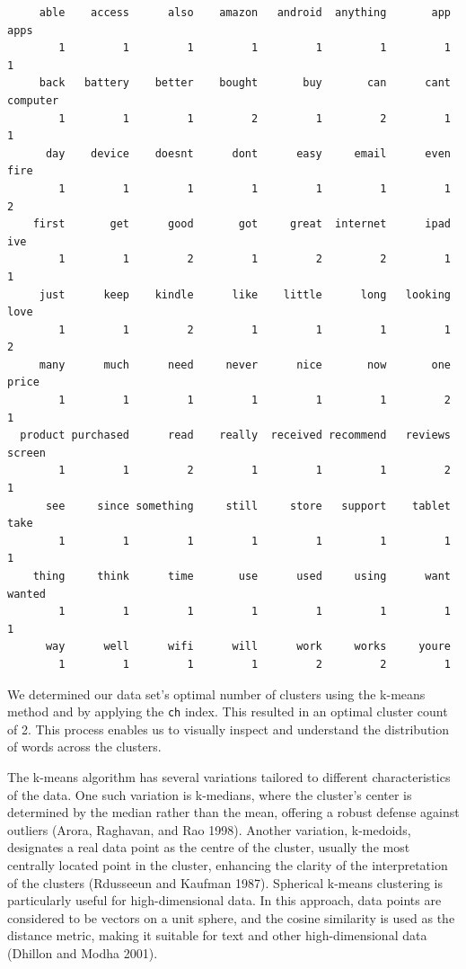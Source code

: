 \begin{verbatim}
     able    access      also    amazon   android  anything       app      apps 
        1         1         1         1         1         1         1         1 
     back   battery    better    bought       buy       can      cant  computer 
        1         1         1         2         1         2         1         1 
      day    device    doesnt      dont      easy     email      even      fire 
        1         1         1         1         1         1         1         2 
    first       get      good       got     great  internet      ipad       ive 
        1         1         2         1         2         2         1         1 
     just      keep    kindle      like    little      long   looking      love 
        1         1         2         1         1         1         1         2 
     many      much      need     never      nice       now       one     price 
        1         1         1         1         1         1         2         1 
  product purchased      read    really  received recommend   reviews    screen 
        1         1         2         1         1         1         2         1 
      see     since something     still     store   support    tablet      take 
        1         1         1         1         1         1         1         1 
    thing     think      time       use      used     using      want    wanted 
        1         1         1         1         1         1         1         1 
      way      well      wifi      will      work     works     youre 
        1         1         1         1         2         2         1 
\end{verbatim}

We determined our data set's optimal number of clusters using the k-means
method and by applying the \texttt{ch} index. This resulted in an
optimal cluster count of 2. This process enables us to visually inspect
and understand the distribution of words across the clusters.

The k-means algorithm has several variations tailored to different characteristics of the data. One such variation is k-medians, where the cluster's
center is determined by the median rather than the mean, offering a
robust defense against outliers (Arora, Raghavan, and Rao 1998). Another
variation, k-medoids, designates a real data point as the centre of the cluster, usually the most centrally located point in the cluster,
enhancing the clarity of the interpretation of the clusters (Rdusseeun and Kaufman
1987). Spherical k-means clustering is particularly useful for high-dimensional
data. In this approach, data points are considered to be vectors on a unit
sphere, and the cosine similarity is used as the distance metric, making
it suitable for text and other high-dimensional data (Dhillon and Modha
2001).

